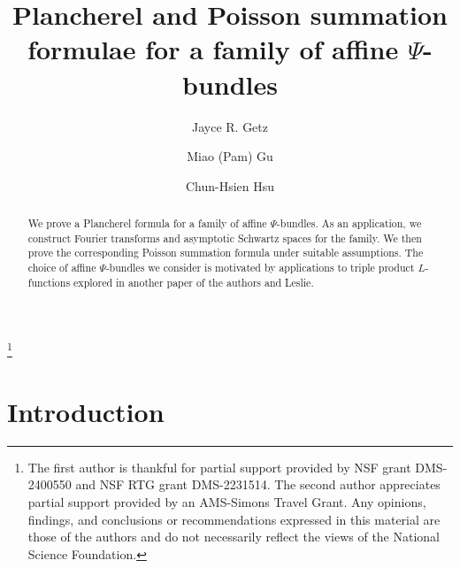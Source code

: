 \documentclass[12pt]{amsart}
\theoremstyle{remark}
\numberwithin{equation}{section}
\theoremstyle{definition}
\numberwithin{equation}{subsection}
\begin{document}
\title[Plancherel and Poisson summation formulae for affine $\Psi$-bundles]{Plancherel and Poisson summation formulae for a family of affine $\Psi$-bundles}

\author{Jayce R. Getz}
\address{Department of Mathematics\\
Duke University\\
Durham, NC 27708}

\author{Miao (Pam) Gu}
\address{Department of Mathematics\\
University of Michigan\\
Ann Arbor, MI 48109-1043}

\author{Chun-Hsien Hsu}
\address{Department of Mathematics\\
University of Chicago\\
Chicago, IL 60637}




\thanks{The first author is thankful for partial support provided by NSF grant DMS-2400550 and NSF RTG grant DMS-2231514. The second author appreciates partial support provided by an AMS-Simons Travel Grant. Any opinions, findings, and conclusions or recommendations expressed in this material are those of the authors and do not necessarily reflect the views of the National Science Foundation. 
}
\begin{abstract}
We prove a Plancherel formula for a family of affine $\Psi$-bundles.  As an application, we construct Fourier transforms and asymptotic Schwartz spaces for the family.  We then prove the corresponding Poisson summation formula under suitable assumptions.  The choice of affine $\Psi$-bundles we consider is motivated by applications to triple product $L$-functions explored in another paper of the authors and Leslie.
\end{abstract}

\maketitle

\setcounter{tocdepth}{2}
{\small
\begin{multicols}{2}
\tableofcontents
\end{multicols}
}



\section{Introduction}
\end{document}
